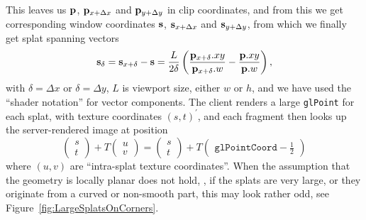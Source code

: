 This leaves us $\mathbf{p}$, $\mathbf{p}_{x+\Delta x}$ and $\mathbf{p}_{y+\Delta y}$ in clip
coordinates, and from this we get
corresponding window coordinates $\mathbf{s}$, $\mathbf{s}_{x+\Delta x}$ and $\mathbf{s}_{y+\Delta
y}$, from which we finally get splat spanning vectors
\[
  \mathbf{s}_{\delta} =
  \mathbf{s}_{x+\delta} - \mathbf{s} =
    \frac{L}{2\delta} \left(
        \frac{\mathbf{p}_{x+\delta}.xy}{\mathbf{p}_{x+\delta}.w} -
        \frac{\mathbf{p}.xy}{\mathbf{p}.w}
    \right),
\]
with $\delta=\Delta x$ or $\delta=\Delta y$, $L$ is viewport size, either $w$ or
$h$, and we have used the ``shader notation'' for vector components.  The client
renders a large \texttt{glPoint} for each splat, with texture coordinates $(s,
t)^\prime$, and each fragment then looks up the server-rendered image at
position
\[
  \begin{pmatrix}
    s \\ t
  \end{pmatrix} +
  T 
  \begin{pmatrix}
    u \\ v
  \end{pmatrix}
  =
  \begin{pmatrix}
    s \\ t
  \end{pmatrix} +
  T 
  \begin{pmatrix}
    \texttt{glPointCoord}-\frac{1}{2}
  \end{pmatrix}
\]
where $(u, v)$ are ``intra-splat texture coordinates''.  When the assumption
that the geometry is locally planar does not hold, \eg, if the splats are very
large, or they originate from a curved or non-smooth part, this may look rather
odd, see Figure~\ref{fig:LargeSplatsOnCorners}.

